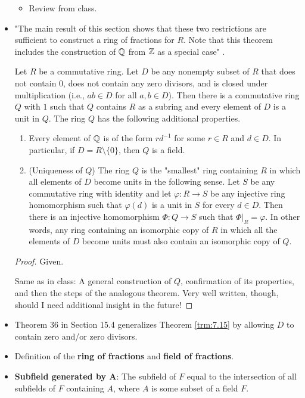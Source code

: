 \documentclass[../notes.tex]{subfiles}
\begin{document}
\begin{itemize}
\begin{itemize}
        \item Review from class.
    \end{itemize}
    \item "The main result of this section shows that these two restrictions are sufficient to construct a ring of fractions for $R$. Note that this theorem includes the construction of $\mathbb{Q}$ from $\mathbb{Z}$ as a special case" \parencite[261]{bib:DummitFoote}.
    \begin{theorem}\label{trm:7.15}
        Let $R$ be a commutative ring. Let $D$ be any nonempty subset of $R$ that does not contain 0, does not contain any zero divisors, and is closed under multiplication (i.e., $ab\in D$ for all $a,b\in D$). Then there is a commutative ring $Q$ with $1$ such that $Q$ contains $R$ as a subring and every element of $D$ is a unit in $Q$. The ring $Q$ has the following additional properties.
        \begin{enumerate}
            \item Every element of $\mathbb{Q}$ is of the form $rd^{-1}$ for some $r\in R$ and $d\in D$. In particular, if $D=R\setminus\{0\}$, then $Q$ is a field.
            \item (Uniqueness of $Q$) The ring $Q$ is the "smallest" ring containing $R$ in which all elements of $D$ become units in the following sense. Let $S$ be any commutative ring with identity and let $\varphi:R\to S$ be any injective ring homomorphism such that $\varphi(d)$ is a unit in $S$ for every $d\in D$. Then there is an injective homomorphism $\Phi:Q\to S$ such that $\Phi|_R=\varphi$. In other words, any ring containing an isomorphic copy of $R$ in which all the elements of $D$ become units must also contain an isomorphic copy of $Q$.
        \end{enumerate}
        \begin{proof}
            Given.\par
            Same as in class: A general construction of $Q$, confirmation of its properties, and then the steps of the analogous theorem. Very well written, though, should I need additional insight in the future!
        \end{proof}
    \end{theorem}
    \item Theorem 36 in Section 15.4 generalizes Theorem \ref{trm:7.15} by allowing $D$ to contain zero and/or zero divisors.
    \item Definition of the \textbf{ring of fractions} and \textbf{field of fractions}.
    \item \textbf{Subfield generated by $\bm{A}$}: The subfield of $F$ equal to the intersection of all subfields of $F$ containing $A$, where $A$ is some subset of a field $F$.

\end{itemize}
\end{document}
